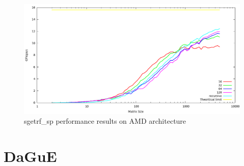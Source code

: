 \documentclass{report}
\begin{document}
\begin{figure}[!h]
\begin{center}
\includegraphics[width=\textwidth]{exp_sgetrf_sp_amd.png} 
\end{center}
\caption{sgetrf\_sp performance results on AMD architecture}
\end{figure}

\chapter{DaGuE}
\end{document}

